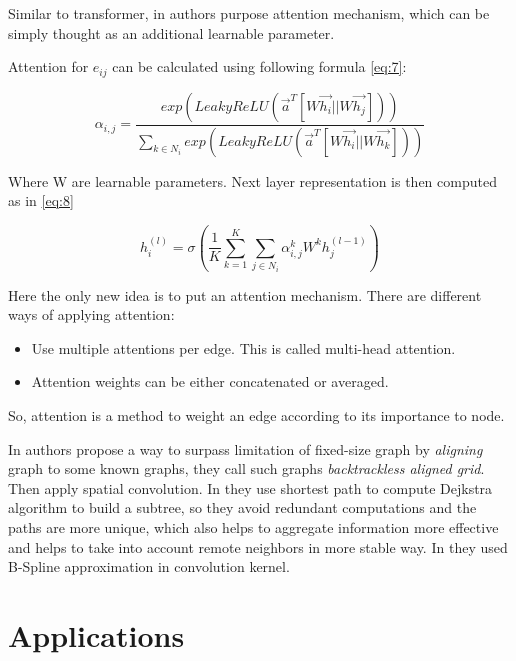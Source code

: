 Similar to transformer\cite{Vaswani_Shazeer_Parmar_Uszkoreit_Jones_Gomez_Kaiser_Polosukhin_2017}, in \cite{Velicković_Cucurull_Casanova_Romero_Liò_Bengio_2017} authors purpose attention mechanism, which can be simply thought as an additional learnable parameter.

Attention for $e_{ij}$ can be calculated using following formula \ref{eq:7}:

\begin{equation}
    \alpha_{i,j}=\dfrac{exp(LeakyReLU(\vec{a}^T[W\vec{h_i}||W\vec{h_j}]))}{\sum_{k\in N_i}exp(LeakyReLU(\vec{a}^T[W\vec{h_i}||W\vec{h_k}]))}
    \label{eq:7}
\end{equation}

Where W are learnable parameters. Next layer representation is then computed as in \ref{eq:8}

\begin{equation}
    h_i^{(l)}=\sigma(\dfrac{1}{K}\sum_{k=1}^{K}\sum_{j\in N_i}{\alpha^k_{i,j}W^kh^{(l-1)}_j})
    \label{eq:8}
\end{equation}

Here the only new idea is to put an attention mechanism. There are different ways of applying attention:

\begin{itemize}
    \item Use multiple attentions per edge. This is called multi-head attention.
    \item Attention weights can be either concatenated or averaged.
\end{itemize}

So, attention is a method to weight an edge according to its importance to node.

In \cite{Bai_Cui_Jiao_Rossi_Hancock_2019} authors propose a way to surpass limitation of fixed-size graph by \textit{aligning} graph to some known graphs, they call such graphs \textit{backtrackless aligned grid}. Then apply spatial convolution. In \cite{Yang_Wang_Song_Yuan_Tao_2021} they use shortest path to compute Dejkstra algorithm to build a subtree, so they avoid redundant computations and the paths are more unique, which also helps to aggregate information more effective and helps to take into account remote neighbors in more stable way. In \cite{Fey_Lenssen_Weichert_Muller_2018} they used B-Spline approximation in convolution kernel.

\chapter{Applications}

